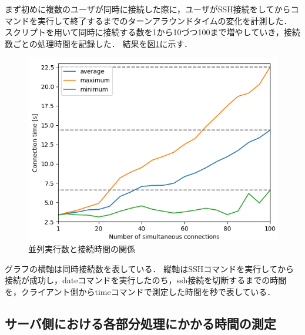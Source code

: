 \documentclass[dvipdfmx]{cs-handout}
\begin{document}
まず初めに複数のユーザが同時に接続した際に，ユーザがSSH接続をしてからコマンドを実行して終了するまでのターンアラウンドタイムの変化を計測した．
スクリプトを用いて同時に接続する数を1から10づつ100まで増やしていき，接続数ごとの処理時間を記録した．
結果を図\ref{fig:connect}に示す．
%
%
%
\begin{figure}[tb]
\includegraphics[width=\linewidth]{./fig/connect.png}
\caption{並列実行数と接続時間の関係}
\label{fig:connect}
\end{figure}

グラフの横軸は同時接続数を表している．
縦軸はSSHコマンドを実行してから接続が成功し，dateコマンドを実行したのち，ssh接続を切断するまでの時間を，クライアント側からtimeコマンドで測定した時間を秒で表している．

\subsection{サーバ側における各部分処理にかかる時間の測定}
\end{document}
